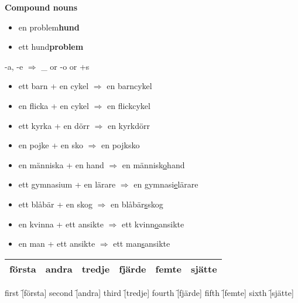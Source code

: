 
\begin{flushleft}
    \textbf{Compound nouns}
    \begin{itemize}
        \item en problem\textbf{hund}
        \item ett hund\textbf{problem}
    \end{itemize}

    -a, -e $\Rightarrow$ \_ or -o or +s
    \begin{itemize}
        \item ett barn + en cykel $\Rightarrow$ en barncykel
        \item en flicka + en cykel $\Rightarrow$ en flickcykel
        \item ett kyrka + en dörr $\Rightarrow$ en kyrkdörr
        \item en pojke + en sko $\Rightarrow$ en pojksko
        \item en människa + en hand $\Rightarrow$ en människ\underline{o}hand
        \item ett gymnasium + en lärare $\Rightarrow$ en gymnasi\underline{e}lärare
        \item ett blåbär + en skog $\Rightarrow$ en blåbär\underline{s}skog
        \item en kvinna + ett ansikte $\Rightarrow$ ett kvinn\underline{o}ansikte
        \item en man + ett ansikte $\Rightarrow$ ett man\underline{s}ansikte
    \end{itemize}
\end{flushleft}

\begin{center}
    \begin{tabular}{|c c c c c c|}
        \hline
        första & andra & tredje & fjärde & femte & sjätte \\
        \hline
    \end{tabular}
\end{center}

\begin{questions}
    \begin{multicols}{2}
        \raggedcolumns
        \question first \f[första]
        \question second \f[andra]
        \question third \f[tredje]
        \question fourth \f[fjärde]
        \question fifth \f[femte]
        \question sixth \f[sjätte]
    \end{multicols}
\end{questions}
